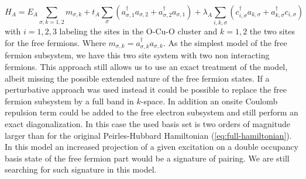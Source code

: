 \begin{equation}
\label{eq:multicomponent}
H_A = 
E_A \sum_{\sigma, k=1,2} m_{\sigma, k} + 
t_A \sum_{\sigma} (a_{\sigma, 1}^\dagger a_{\sigma, 2} + a_{\sigma,2}^\dagger a_{\sigma, 1}) + 
\lambda_A \sum_{i,k,\sigma} \left( c_{i,\sigma}^\dagger a_{k,\sigma} + a_{k,\sigma}^\dagger c_{i,\sigma} \right) \end{equation}
%
with $i=1,2,3$ labeling the sites in the O-Cu-O cluster and $k=1,2$ the two sites for the free fermions. Where $m_{\sigma, k} = a_{\sigma, k}^\dagger a_{\sigma, k}$.
As the simplest model of the free fermion subsystem, we have this two site system with two non interacting fermions. This approach still allows us to use an exact treatment of the model, albeit missing the possible extended nature of the free fermion states. If a perturbative approach was used instead it could be possible to replace the free fermion subsystem by a full band in $k$-space. In addition an onsite Coulomb repulsion term could be added to the free electron subsystem and still perform an exact diagonalization.  In this case the used basis set is two orders of magnitude larger than for the original Peirles-Hubbard Hamiltonian (\ref{eq:full-hamiltonian}). In this model an increased projection of a given excitation on a double occupancy basis state of the free fermion part  would be a signature of pairing. We are still searching for such signature in this model.
